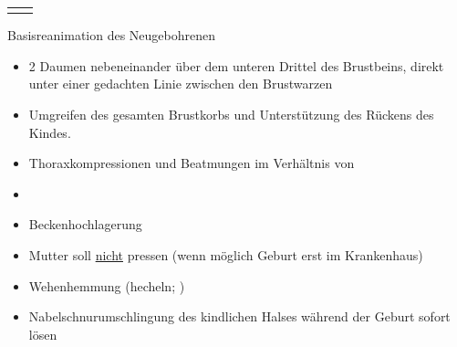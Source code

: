 {{\begin{tabularx}{\linewidth}{XX}
  
  
  \\\addlinespace\bottomrule
\end{tabularx}
}

\cite{Erc2010Sek06De,AsboeLehrmeinungRd2011-19,AsboeLehrmeinungRd2011-18}
}

{Basisreanimation des Neugebohrenen}
{\label{m:neugeborenes-basisreanimation}}
{
\begin{itemize}
  \item 2 Daumen nebeneinander über dem
  unteren Drittel des Brustbeins, direkt unter einer gedachten Linie zwischen den
  Brustwarzen
  
  \item Umgreifen des gesamten
  Brustkorbs und Unterstützung des Rückens des Kindes.
  \item Thoraxkompressionen und Beatmungen im Verhältnis von
  
  \item \TxMassVitMK
\end{itemize}

\cite{Erc2010Sek06De}
}



{\label{m:nabelschnurvorfall}}
{
\begin{itemize}
	\item Beckenhochlagerung
	\item Mutter soll \underline{nicht} pressen (wenn möglich Geburt erst im
	Krankenhaus)
	\item Wehenhemmung (hecheln; )
	\item Nabelschnurumschlingung des kindlichen Halses während der Geburt sofort lösen
\end{itemize}
}






